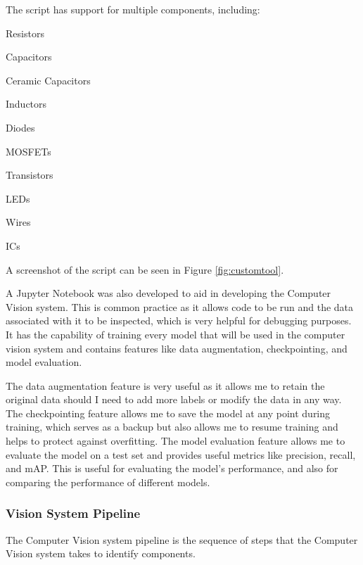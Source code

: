 The script has support for multiple components, including:
\begin{multicols}{2}
    \begin{mylist}
        \item Resistors
        \item Capacitors
        \item Ceramic Capacitors
        \item Inductors
        \item Diodes
        \item MOSFETs
        \item Transistors
        \item LEDs
        \item Wires
        \item ICs
    \end{mylist}
\end{multicols}

\noindent
A screenshot of the script can be seen in Figure \ref*{fig:customtool}.

A Jupyter Notebook\cite{jupyter} was also developed to aid in developing the Computer Vision system. This is common practice as it
allows code to be run and the data associated with it to be inspected, which is very helpful for debugging purposes. It 
has the capability of training every model that will be used in the computer vision system and contains features like
data augmentation, checkpointing, and model evaluation.

The data augmentation feature is very useful as it allows me to 
retain the original data should I need to add more labels or modify the data in any way. The checkpointing feature allows
me to save the model at any point during training, which serves as a backup but also allows me to resume training and helps 
to protect against overfitting. The model evaluation feature allows me to evaluate the model on a test set and provides
useful metrics like precision, recall, and mAP. This is useful for evaluating the model's performance, and also for
comparing the performance of different models.

\subsubsection{Vision System Pipeline}
The Computer Vision system pipeline is the sequence of steps that the Computer Vision system takes to identify components.

